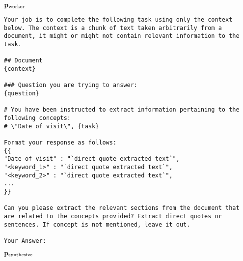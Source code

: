 \textbf{$\mathbf{p}_{\text{worker}}$}

\begin{tcolorbox}[colback=gray!10,  width=\textwidth]
\begin{lstlisting}[breaklines]
Your job is to complete the following task using only the context below. The context is a chunk of text taken arbitrarily from a document, it might or might not contain relevant information to the task.

## Document
{context}

### Question you are trying to answer: 
{question}

# You have been instructed to extract information pertaining to the following concepts: 
# \"Date of visit\", {task}

Format your response as follows:
{{
"Date of visit" : "`direct quote extracted text`",
"<keyword_1>" : "`direct quote extracted text`", 
"<keyword_2>" : "`direct quote extracted text`", 
...
}}

Can you please extract the relevant sections from the document that are related to the concepts provided? Extract direct quotes or sentences. If concept is not mentioned, leave it out.

Your Answer:
\end{lstlisting}
\end{tcolorbox}

\textbf{$\mathbf{p}_{\text{synthesize}}$}

